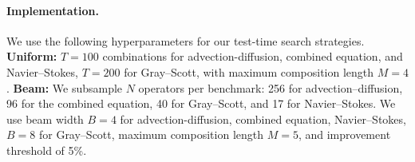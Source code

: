 \documentclass{article}
\newcommand{\newnew}[1]{\begingroup\color{newaddition}#1\endgroup}
\theoremstyle{plain}
\theoremstyle{definition}
\theoremstyle{remark}
\begin{document}

\paragraph{Implementation.} 
We use the following hyperparameters for our test-time search strategies. \textbf{Uniform:} $T=100$ combinations for advection-diffusion, combined equation, and Navier--Stokes, $T=200$ for Gray--Scott, with maximum composition length $M=4$. \textbf{Beam:} We subsample $N$ operators per benchmark: 256 for advection–diffusion, 96 for the combined equation, 40 for Gray–Scott, and 17 for Navier–Stokes. We use beam width $B=4$ for advection-diffusion, combined equation, Navier--Stokes, $B=8$ for Gray--Scott, maximum composition length $M=5$, and improvement threshold of 5\%.
\end{document}
